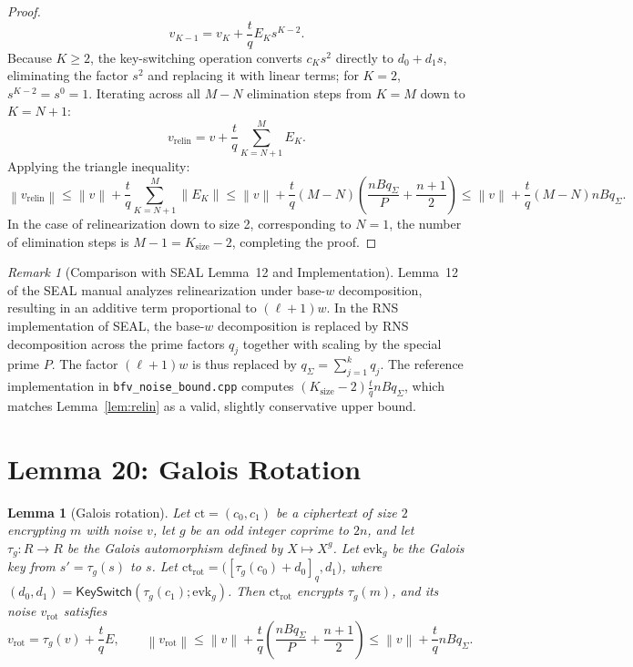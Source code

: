 \documentclass[11pt]{article}
\newtheorem{lemma}{Lemma}
\theoremstyle{definition}
\theoremstyle{remark}
\newtheorem{remark}{Remark}
\newcommand{\norm}[1]{\left\lVert #1\right\rVert}
\newcommand{\ct}{\mathrm{ct}}
\newcommand{\vrelin}{v_{\mathrm{relin}}}
\newcommand{\ctrot}{\mathrm{ct}_{\mathrm{rot}}}
\newcommand{\vrot}{v_{\mathrm{rot}}}
\newcommand{\KS}{\mathsf{KeySwitch}}
\begin{document}
\begin{proof}
\[
  v_{K-1} = v_K + \frac{t}{q} E_K s^{K-2}.
\]
Because $K \geq 2$, the key-switching operation converts $c_K s^2$ directly to $d_0 + d_1 s$, eliminating the factor $s^2$ and replacing it with linear terms; for $K=2$, $s^{K-2} = s^0 = 1$.
Iterating across all $M-N$ elimination steps from $K = M$ down to $K = N+1$:
\[
  \vrelin = v + \frac{t}{q}\sum_{K=N+1}^M E_K.
\]
Applying the triangle inequality:
\[
  \norm{\vrelin} \leq \norm{v} + \frac{t}{q}\sum_{K=N+1}^M \norm{E_K} \leq \norm{v} + \frac{t}{q}(M-N)\left(\frac{n B q_\Sigma}{P} + \frac{n+1}{2}\right) \leq \norm{v} + \frac{t}{q}(M-N) n B q_\Sigma.
\]
In the case of relinearization down to size 2, corresponding to $N=1$, the number of elimination steps is $M-1 = K_{\mathrm{size}}-2$, completing the proof.
\end{proof}

\begin{remark}[Comparison with SEAL Lemma~12 and Implementation]
Lemma~12 of the SEAL manual analyzes relinearization under base-$w$ decomposition, resulting in an additive term proportional to $(\ell+1)w$.
In the RNS implementation of SEAL, the base-$w$ decomposition is replaced by RNS decomposition across the prime factors $q_j$ together with scaling by the special prime $P$.
The factor $(\ell+1)w$ is thus replaced by $q_\Sigma = \sum_{j=1}^k q_j$.
The reference implementation in \texttt{bfv\_noise\_bound.cpp} computes $(K_{\mathrm{size}}-2) \frac{t}{q} n B q_\Sigma$, which matches Lemma~\ref{lem:relin} as a valid, slightly conservative upper bound.
\end{remark}

\section*{Lemma 20: Galois Rotation}

\begin{lemma}[Galois rotation]\label{lem:rot}
Let $\ct = (c_0, c_1)$ be a ciphertext of size $2$ encrypting $m$ with noise $v$, let $g$ be an odd integer coprime to $2n$, and let $\tau_g\colon R \to R$ be the Galois automorphism defined by $X \mapsto X^g$.
Let $\mathrm{evk}_g$ be the Galois key from $s' = \tau_g(s)$ to $s$.
Let $\ctrot = \bigl([\tau_g(c_0) + d_0]_q, d_1\bigr)$, where $(d_0, d_1) = \KS(\tau_g(c_1); \mathrm{evk}_g)$.
Then $\ctrot$ encrypts $\tau_g(m)$, and its noise $\vrot$ satisfies
\[
  \vrot = \tau_g(v) + \frac{t}{q}E, \qquad
  \norm{\vrot} \leq \norm{v} + \frac{t}{q}\left(\frac{n B q_\Sigma}{P} + \frac{n+1}{2}\right) \leq \norm{v} + \frac{t}{q} n B q_\Sigma.
\]
\end{lemma}
\end{document}
